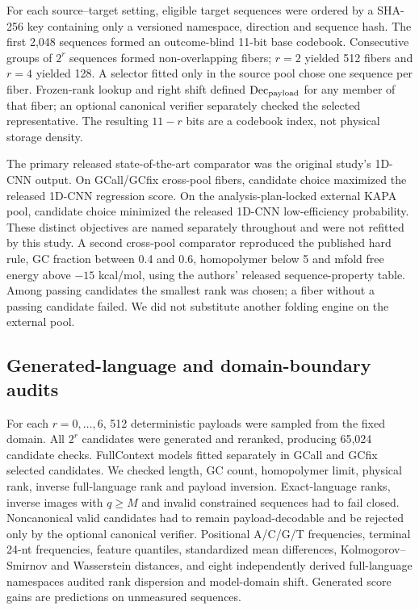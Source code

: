 \documentclass[unnumsec,webpdf,modern,large]{oup-authoring-template}
\begin{document}
For each source--target setting, eligible target sequences were ordered by a SHA-256 key containing only a versioned namespace, direction and sequence hash. The first 2,048 sequences formed an outcome-blind 11-bit base codebook. Consecutive groups of $2^r$ sequences formed non-overlapping fibers; $r=2$ yielded 512 fibers and $r=4$ yielded 128. A selector fitted only in the source pool chose one sequence per fiber. Frozen-rank lookup and right shift defined $\operatorname{Dec}_{\rm payload}$ for any member of that fiber; an optional canonical verifier separately checked the selected representative. The resulting $11-r$ bits are a codebook index, not physical storage density.

The primary released state-of-the-art comparator was the original study's 1D-CNN output. On GCall/GCfix cross-pool fibers, candidate choice maximized the released 1D-CNN regression score. On the analysis-plan-locked external KAPA pool, candidate choice minimized the released 1D-CNN low-efficiency probability. These distinct objectives are named separately throughout and were not refitted by this study. A second cross-pool comparator reproduced the published hard rule, GC fraction between 0.4 and 0.6, homopolymer below 5 and mfold free energy above $-15$ kcal/mol, using the authors' released sequence-property table. Among passing candidates the smallest rank was chosen; a fiber without a passing candidate failed. We did not substitute another folding engine on the external pool.

\subsection{Generated-language and domain-boundary audits}

For each $r=0,\ldots,6$, 512 deterministic payloads were sampled from the fixed domain. All $2^r$ candidates were generated and reranked, producing 65,024 candidate checks. FullContext models fitted separately in GCall and GCfix selected candidates. We checked length, GC count, homopolymer limit, physical rank, inverse full-language rank and payload inversion. Exact-language ranks, inverse images with $q\geq M$ and invalid constrained sequences had to fail closed. Noncanonical valid candidates had to remain payload-decodable and be rejected only by the optional canonical verifier. Positional A/C/G/T frequencies, terminal 24-nt frequencies, feature quantiles, standardized mean differences, Kolmogorov--Smirnov and Wasserstein distances, and eight independently derived full-language namespaces audited rank dispersion and model-domain shift. Generated score gains are predictions on unmeasured sequences.
\end{document}
